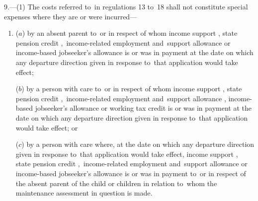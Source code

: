 \documentclass[12pt,a4paper]{article}
\begin{document}
9.—(1) The costs referred to~in regulations 13 to~18 shall not constitute special expenses where they are or were incurred—
\begin{enumerate}\item[]
($a$) by an absent parent to~or in respect of whom income support%
, state pension credit%
,~income-related employment and~support allowance  %
 or income-based jobseeker’s allowance is or was in payment at the date on which any departure direction given in response to~that application would take effect;

($b$) by a person with care to~or in respect of whom income support%
, state pension credit%
,~income-related employment and~support allowance%
, income-based jobseeker’s allowance
or working tax credit  %
is or was in payment at the date on which any departure direction given in response to~that application would take effect; or

($c$) by a person with care where, at the date on which any departure direction given in response to~that application would take effect, income support%
, state pension credit%
,~income-related employment and~support allowance  %
or income-based jobseeker’s allowance is or was in payment to~or in respect of the absent parent of the child or children in relation to~whom the maintenance assessment in question is made.
\end{enumerate}
\end{document}
